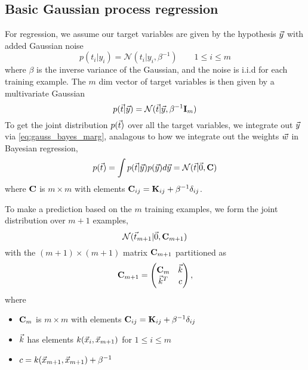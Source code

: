 \documentclass[11pt]{article}
\begin{document}
\subsection{Basic Gaussian process regression}
For regression, we assume our target variables are given by the hypothesis $\vec{y}$ with
added Gaussian noise
\begin{equation}
  p(t_i | y_i) = \mathcal{N}(t_i | y_i, \beta^{-1}) \qquad 1 \leq i \leq m
\end{equation}
where $\beta$ is the inverse variance of the Gaussian, and the noise is i.i.d for each
training example. The $m$ dim vector of target variables is then given by a multivariate
Gaussian
\begin{equation}
  p(\vec{t} | \vec{y}) = \mathcal{N}(\vec{t} | \vec{y}, \beta^{-1} \mathbf{I}_m)
\end{equation}
To get the joint distribution $p(\vec{t})$ over all the target variables, we integrate out
$\vec{y}$ via \ref{eq:gauss_bayes_marg}, analagous to how we integrate out the weights
$\vec{w}$ in Bayesian regression,
\begin{equation}
  p(\vec{t}) = \int p(\vec{t} | \vec{y}) p(\vec{y}) d\vec{y} = \mathcal{N}(\vec{t} | \vec{0}, \mathbf{C})
\end{equation}
where $\mathbf{C}$ is $m \times m$ with elements
$\mathbf{C}_{ij} = \mathbf{K}_{ij} + \beta^{-1} \delta_{ij}$.

To make a prediction based on the $m$ training examples, we form the joint distribution
over $m+1$ examples,
\begin{equation}
  \mathcal{N}(\vec{t}_{m+1} | \vec{0}, \mathbf{C}_{m+1})
\end{equation}
with the $(m+1) \times (m+1)$ matrix $\mathbf{C}_{m+1}$ partitioned as
\begin{equation}
  \mathbf{C}_{m+1} = 
  \left(
    \begin{matrix}
      \mathbf{C}_m & \vec{k}\\
      \vec{k}^T   & c
    \end{matrix}
  \right),
\end{equation}
where
\begin{itemize}
  \item $\mathbf{C}_m$ is $m \times m$ with elements
  $\mathbf{C}_{ij} = \mathbf{K}_{ij} + \beta^{-1} \delta_{ij}$
  \item $\vec{k}$ has elements $k(\vec{x}_i, \vec{x}_{m+1})$ for $1 \leq i \leq m$
  \item $c = k(\vec{x}_{m+1}, \vec{x}_{m+1}) + \beta^{-1}$
\end{itemize}
\end{document}

